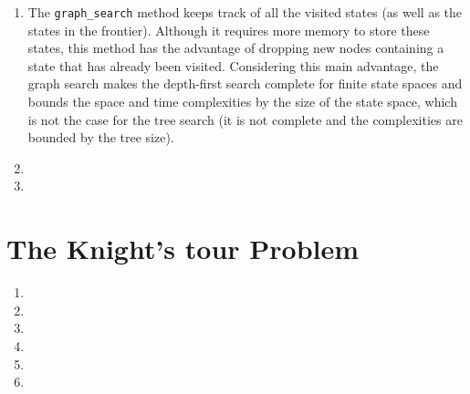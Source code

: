 \documentclass[a4paper,10pt]{article}
\newcommand{\py}[1]{\texttt{#1}}
\begin{document}
\begin{enumerate}
\begin{itemize}
 \end{itemize}
 \item The \py{graph_search} method keeps track of all the visited states (as well as the states in the frontier).
 Although it requires more memory to store these states, this method has the advantage of dropping new nodes containing a state that has already been visited.
 Considering this main advantage, the graph search makes the depth-first search complete for finite state spaces and bounds the space and time complexities by the size of the state space, which is not the case for the tree search (it is not complete and the complexities are bounded by the tree size).
 \item %
 \item %
\end{enumerate}


\section{The Knight’s tour Problem}

\begin{enumerate}
 \item 
 \item 
 \item 
 \item 
 \item 
 \item 
\end{enumerate}
\end{document}
